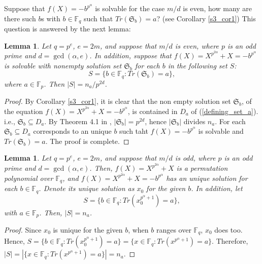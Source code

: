 \documentclass[final,1p,times]{elsarticle}
\newtheorem{sec3_lemma5}[sec3_lemma1x]{Lemma}
\newtheorem{sec3_lemma6}[sec3_lemma1x]{Lemma}
\begin{document}
  Suppose that $ f(X)=- b^{p^{\alpha}}$ is solvable for the case $ m/d $ is even, how many are there such $ b $s with $ b\in \mathbb{F}_{q} $ such that $ Tr(\mathfrak{S}_{b})=a $? (see Corollary \ref{s3_cor1}) This question is answered by the next lemma:
  
  \begin{sec3_lemma5}\label{s3_lemma5}
   Let $ q=p^{e} $,  $ e=2m $,  and suppose that $ m/d $ is even, where $ p $ is an odd prime and $ d=\gcd(\alpha,e) $. In addition, suppose that $ f(X)=X^{p^{2\alpha}} +X=- b^{p^{\alpha}} $ is solvable with nonempty solution set $ \mathfrak{S}_{b} $ for each $ b $ in the following set $  S $: 
    \begin{equation*}
    S=\biggl\lbrace b\in \mathbb{F}_{q}: Tr(\mathfrak{S}_{b})=a\biggr\rbrace,
    \end{equation*}
    where $ a\in \mathbb{F}_{p} $. Then $ | S |=n_{a}/p^{2d} $. 
  \end{sec3_lemma5}
  \begin{proof}
  By Corollary \ref{s3_cor1}, it is clear that the non empty solution set $ \mathfrak{S}_{b} $, of the equation $ f(X)=X^{p^{2\alpha}} +X=- b^{p^{\alpha}} $, is contained in $ D_{a} $ of (\ref{defining_set_a}). i.e., $ \mathfrak{S}_{b}\subseteq D_{a} $. By Theorem 4.1 in \cite{Bib9}, $ |\mathfrak{S}_{b}| =p^{2d} $, hence $ | \mathfrak{S}_{b}|$ divides $n_{a} $. For each $ \mathfrak{S}_{b}\subseteq D_{a} $ corresponds to an unique $ b $ such taht $ f(X)=- b^{p^{\alpha}}   $ is solvable and $ Tr(\mathfrak{S}_{b})=a $. The proof is complete.
  \end{proof}
  
  \begin{sec3_lemma6}\label{s3_lemma6}
  Let $ q=p^{e} $,  $ e=2m $,  and suppose that $ m/d $ is odd, where $ p $ is an odd prime and $ d=\gcd(\alpha,e) $. Then, $ f(X)=X^{p^{2\alpha}} +X $ is a permutation polynomial over $ \mathbb{F}_{q} $, and $ f(X)=X^{p^{2\alpha}} +X=- b^{p^{\alpha}} $ has an unique solution for each $ b\in  \mathbb{F}_{q}$. Denote its unique solution as $ x_{0} $ for the given $ b $. In addition, let 
  \begin{equation*}
  S=\biggl\lbrace b\in  \mathbb{F}_{q} : Tr(x_{0}^{p^{\alpha}+1})=a \biggr\rbrace,
  \end{equation*}
  with $ a\in  \mathbb{F}_{p} $. Then, $ |S|=n_{a} $.
  \end{sec3_lemma6}
  \begin{proof}
  Since $ x_{0} $ is unique for the given $ b $, when $ b $ ranges over $ \mathbb{F}_{q} $, $ x_{0} $ does too. Hence,
 $ S=\lbrace b\in  \mathbb{F}_{q} : Tr(x_{0}^{p^{\alpha}+1})=a \rbrace
 =\lbrace x\in  \mathbb{F}_{q} : Tr(x^{p^{\alpha}+1})=a \rbrace. $
  Therefore, $ |S|=|\lbrace x\in  \mathbb{F}_{q} : Tr(x^{p^{\alpha}+1})=a \rbrace|=n_{a} $.
  \end{proof}
  
\end{document}
